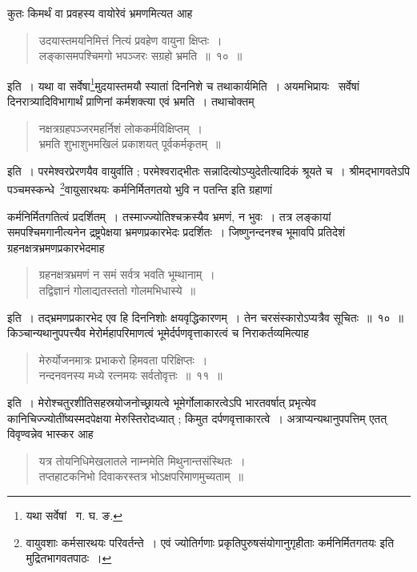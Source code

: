 \documentclass[11pt, openany]{book}
\begin{document}
\indent कुतः किमर्थं वा प्रवहस्य वायोरेवं भ्रमणमित्यत आह\textendash 

\begin{quote}
{\ab उदयास्तमयनिमित्तं नित्यं प्रवहेण वायुना क्षिप्तः~। \\
 लङ्कासमपश्चिमगो भपञ्जरः सग्रहो भ्रमति~॥~१०~॥} 
\end{quote}

\indent इति~। यथा वा सर्वेषा\renewcommand{\thefootnote}{२}\footnote{यथा सर्वेषां \textendash\ ग. घ. ङ.}मुदयास्तमयौ स्यातां दिननिशे च तथाकार्यमिति~। अयमभिप्रायः \textendash\ सर्वेषां दिनरात्र्यादिविभागार्थं प्राणिनां कर्मशक्त्या एवं भ्रमति~। तथाचोक्तम्\textendash  

\begin{quote}
{\qt नक्षत्रग्रहपञ्जरमहर्निशं लोककर्मविक्षिप्तम्~।\\
 भ्रमति शुभाशुभमखिलं प्रकाशयत् पूर्वकर्मकृतम्~॥} 
\end{quote}
 
\indent इति~। परमेश्वरप्रेरणयैव वायुर्वाति ; परमेश्वराद्भीतः सन्नादित्योऽप्युदेतीत्यादिकं श्रूयते च~। श्रीमद्भागवतेऽपि 
पञ्चमस्कन्धे\textendash\ \renewcommand{\thefootnote}{*}\footnote{वायुवशाः कर्मसारथयः परिवर्तन्ते~। एवं ज्योतिर्गणाः प्रकृतिपुरुषसंयोगानुगृहीताः कर्मनिर्मितगतयः इति मुद्रितभागवतपाठः~।}{\qt वायुसारथयः कर्मनिर्मितगतयो भुवि न पतन्ति} इति ग्रहाणां 

\newpage

\noindent कर्मनिर्मितगतित्वं प्रदर्शितम्~। तस्माज्ज्योतिश्चक्रस्यैव भ्रमणं, न भुवः~। तत्र लङ्कायां समपश्चिमगानीत्यनेन द्रष्ट्रपेक्षया भ्रमणप्रकारभेदः प्रदर्शितः~। जिष्णुनन्दनश्च भूमावपि प्रतिदेशं ग्रहनक्षत्रभ्रमणप्रकारभेदमाह\textendash 

\begin{quote}
{\qt ग्रहनक्षत्रभ्रमणं न समं सर्वत्र भवति भूम्थानाम्~।\\
तद्विज्ञानं गोलाद्यतस्ततो गोलमभिधास्ये~॥} 
\end{quote}
इति~। तद्भ्रमणप्रकारभेद एव हि दिननिशोः क्षयवृद्धिकारणम्~। तेन चरसंस्कारोऽप्यत्रैव सूचितः~॥~१०~॥\\ 

किञ्चान्यथानुपपत्त्यैव मेरोर्महापरिमाणत्वं भूमेर्दर्पणवृत्ताकारत्वं च निराकर्तव्यमित्याह\textendash 

\begin{quote}
{\ab मेरुर्योजनमात्रः प्रभाकरो हिमवता परिक्षिप्तः~। \\
 नन्दनवनस्य मध्ये रत्नमयः सर्वतोवृत्तः~॥~११~॥} 
\end{quote}

\indent इति~। मेरोश्चतुरशीतिसहस्रयोजनोच्छ्रायत्वे भूमेर्गोलाकारत्वेऽपि भारतवर्षात् प्रभृत्येव कानिचिज्ज्योतींष्यस्मदपेक्षया मेरुस्तिरोदध्यात् ; किमुत दर्पणवृत्ताकारत्वे~। अत्राप्यन्यथानुपपत्तिम् एतत् विवृण्वन्नेव भास्कर आह\textendash  
\begin{quote}
{\qt यत्र तोयनिधिमेखलातले नाम्नमेति मिथुनान्तसंस्थितः~। \\
तप्तहाटकनिभो दिवाकरस्तत्र भोऽक्षपरिमाणमुच्यताम्~॥} 
\end{quote}
\end{document}
